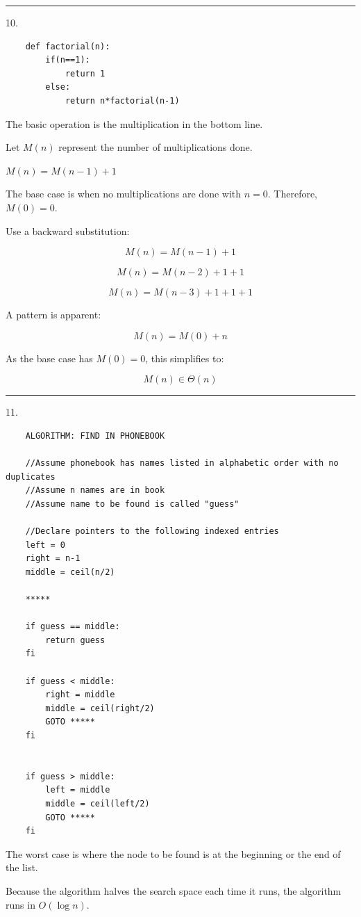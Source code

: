 \documentclass{article}
\begin{document}
\noindent\rule{8cm}{0.4pt}


10. 

\begin{lstlisting}
	def factorial(n):
		if(n==1):
			return 1
		else:
			return n*factorial(n-1)
\end{lstlisting}

The basic operation is the multiplication in the bottom line. 

Let $M(n)$ represent the number of multiplications done. 

$M(n) = M(n-1) + 1$

The base case is when no multiplications are done with $n=0$. Therefore, $M(0) = 0$. 

Use a backward substitution:

\[M(n) = M(n-1) + 1\]

\[M(n) = M(n-2) + 1 + 1\]

\[M(n) = M(n-3) + 1 + 1 + 1\]


A pattern is apparent: 

\[M(n) = M(0) + n\]


As the base case has $M(0) = 0$, this simplifies to: 

\[\boxed{M(n) \in \Theta(n)}\]


\noindent\rule{8cm}{0.4pt}


11. 

\begin{lstlisting}
	ALGORITHM: FIND IN PHONEBOOK

	//Assume phonebook has names listed in alphabetic order with no duplicates
	//Assume n names are in book
	//Assume name to be found is called "guess"

	//Declare pointers to the following indexed entries
	left = 0
	right = n-1
	middle = ceil(n/2)

	*****

	if guess == middle:
		return guess
	fi

	if guess < middle:
		right = middle
		middle = ceil(right/2)
		GOTO *****
	fi


	if guess > middle:
		left = middle
		middle = ceil(left/2)
		GOTO *****
	fi

\end{lstlisting}

The worst case is where the node to be found is at the beginning or the end of the list. 

Because the algorithm halves the search space each time it runs, the algorithm runs in $O(\log n)$. 
\end{document}
